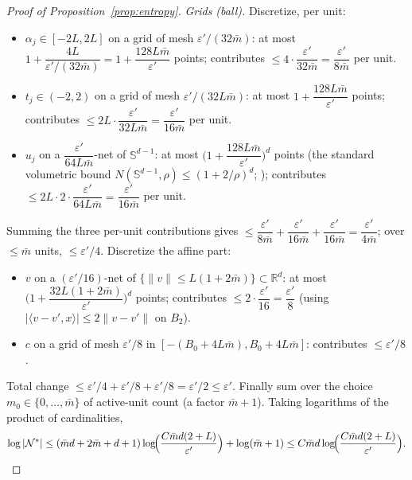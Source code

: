 \documentclass[11pt,reqno]{amsart}
\theoremstyle{plain}
\theoremstyle{definition}
\theoremstyle{remark}
\newcommand{\R}{\mathbb{R}}
\newcommand{\Sd}{\mathbb{S}^{d-1}}
\newcommand{\eps}{\varepsilon}
\newcommand{\NN}{\mathcal{N}}
\newcommand{\inn}[2]{\langle #1,#2\rangle}
\begin{document}
\begin{proof}[Proof of Proposition~\textup{\ref{prop:entropy}}]
\emph{Grids (ball).} Discretize, per unit:
\begin{itemize}
\item $\alpha_j\in[-2L,2L]$ on a grid of mesh $\eps'/(32\bar m)$: at most $1+\dfrac{4L}{\eps'/(32\bar m)}=1+\dfrac{128L\bar m}{\eps'}$ points; contributes $\le4\cdot\dfrac{\eps'}{32\bar m}=\dfrac{\eps'}{8\bar m}$ per unit.
\item $t_j\in(-2,2)$ on a grid of mesh $\eps'/(32L\bar m)$: at most $1+\dfrac{128L\bar m}{\eps'}$ points; contributes $\le2L\cdot\dfrac{\eps'}{32L\bar m}=\dfrac{\eps'}{16\bar m}$ per unit.
\item $u_j$ on a $\dfrac{\eps'}{64L\bar m}$-net of $\Sd$: at most $\bigl(1+\dfrac{128L\bar m}{\eps'}\bigr)^{d}$ points (the standard volumetric bound $N(\Sd,\rho)\le(1+2/\rho)^d$; \cite[Cor.~4.2.13]{Vershynin}); contributes $\le2L\cdot2\cdot\dfrac{\eps'}{64L\bar m}=\dfrac{\eps'}{16\bar m}$ per unit.
\end{itemize}
Summing the three per-unit contributions gives $\le\dfrac{\eps'}{8\bar m}+\dfrac{\eps'}{16\bar m}+\dfrac{\eps'}{16\bar m}=\dfrac{\eps'}{4\bar m}$; over $\le\bar m$ units, $\le\eps'/4$.
Discretize the affine part:
\begin{itemize}
\item $v$ on a $(\eps'/16)$-net of $\{\|v\|\le L(1+2\bar m)\}\subset\R^d$: at most $\bigl(1+\dfrac{32L(1+2\bar m)}{\eps'}\bigr)^d$ points; contributes $\le2\cdot\dfrac{\eps'}{16}=\dfrac{\eps'}8$ (using $|\inn{v-v'}x|\le2\|v-v'\|$ on $B_2$).
\item $c$ on a grid of mesh $\eps'/8$ in $[-(B_0+4L\bar m),B_0+4L\bar m]$: contributes $\le\eps'/8$.
\end{itemize}
Total change $\le\eps'/4+\eps'/8+\eps'/8=\eps'/2\le\eps'$. Finally sum over the choice $m_0\in\{0,\dots,\bar m\}$ of active-unit count (a factor $\bar m+1$). Taking logarithms of the product of cardinalities,
\[
\log|\NN^\ast|\le(\bar md+2\bar m+d+1)\log\!\Bigl(\frac{C\bar m d(2+L)}{\eps'}\Bigr)+\log(\bar m+1)\le C\bar md\log\!\Bigl(\frac{C\bar md(2+L)}{\eps'}\Bigr).
\]


\end{proof}
\end{document}
